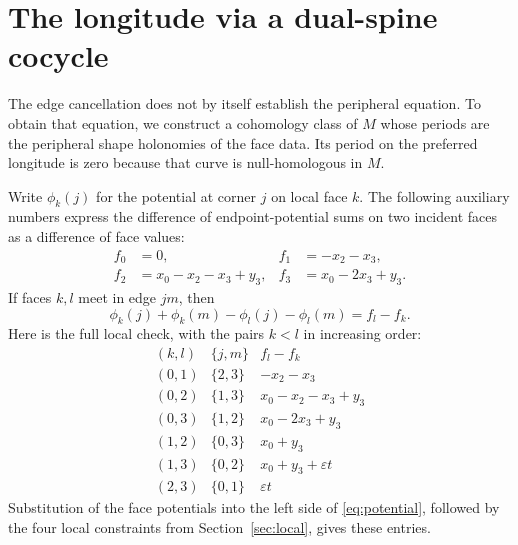\documentclass[11pt]{article}
\theoremstyle{definition}\newtheorem{definition}[theorem]{Definition}
\theoremstyle{remark}\newtheorem{remark}[theorem]{Remark}
\newcommand{\eps}{\varepsilon}
\begin{document}
\section{The longitude via a dual-spine cocycle}\label{sec:peripheral}
The edge cancellation does not by itself establish the peripheral
equation. To obtain that equation, we construct a cohomology class of
$M$ whose periods are the peripheral shape holonomies of the face
data. Its period on the preferred longitude is zero because that
curve is null-homologous in $M$.

Write $\phi_k(j)$ for the potential at corner $j$ on local face $k$.
The following auxiliary numbers express the difference of endpoint-potential
sums on two incident faces as a difference of face values:
\begin{equation}
\begin{aligned}
f_0&=0,&f_1&=-x_2-x_3,\\
f_2&=x_0-x_2-x_3+y_3,&f_3&=x_0-2x_3+y_3.
\end{aligned}
\label{eq:f}
\end{equation}
If faces $k,l$ meet in edge $jm$, then
\begin{equation}
\phi_k(j)+\phi_k(m)-\phi_l(j)-\phi_l(m)=f_l-f_k.
\label{eq:potential}
\end{equation}
Here is the full local check, with the pairs $k<l$ in increasing order:
\[
\begin{array}{c|c|l}
(k,l)&\{j,m\}&f_l-f_k\\\hline
(0,1)&\{2,3\}&-x_2-x_3\\
(0,2)&\{1,3\}&x_0-x_2-x_3+y_3\\
(0,3)&\{1,2\}&x_0-2x_3+y_3\\
(1,2)&\{0,3\}&x_0+y_3\\
(1,3)&\{0,2\}&x_0+y_3+\eps t\\
(2,3)&\{0,1\}&\eps t
\end{array}
\]
Substitution of the face potentials into the left side of
\eqref{eq:potential}, followed by the four local constraints from
Section~\ref{sec:local}, gives these entries.
\end{document}
